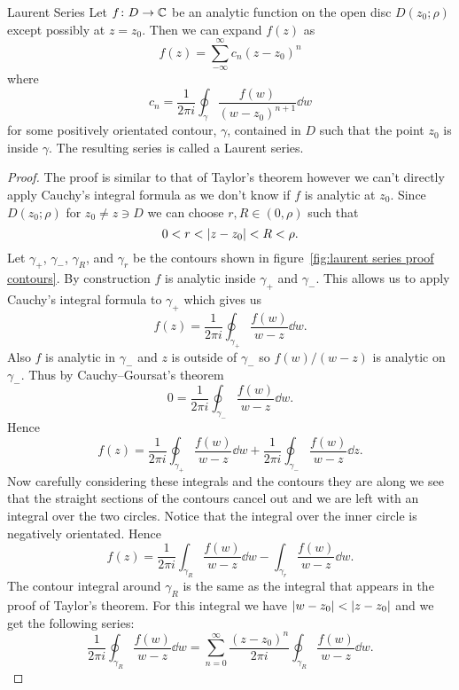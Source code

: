 \documentclass{article}
\newcommand{\discOpen}[2]{D\left({#1}; {#2}\right)}
\begin{document}
    \begin{theorem}{Laurent Series}{}
        Let \(f\colon D\to \mathbb{C}\) be an analytic function on the open disc \(\discOpen{z_0}{\rho}\) except possibly at \(z = z_0\).
        Then we can expand \(f(z)\) as
        \[f(z) = \sum_{-\infty}^{\infty} c_n(z - z_0)^n\]
        where
        \[c_n = \frac{1}{2\pi i}\oint_{\gamma} \frac{f(w)}{(w - z_0)^{n+1}}\dd{w}\]
        for some positively orientated contour, \(\gamma\), contained in \(D\) such that the point \(z_0\) is inside \(\gamma\).
        The resulting series is called a Laurent series.
    \end{theorem}
    \begin{proof}
        The proof is similar to that of Taylor's theorem however we can't directly apply Cauchy's integral formula as we don't know if \(f\) is analytic at \(z_0\).
        Since \(\discOpen{z_0}{\rho}\) for \(z_0\ne z \ni D\) we can choose \(r, R\in(0, \rho)\) such that
        \[0 < r < \abs{z - z_0} < R < \rho.\]
        Let \(\gamma_+\), \(\gamma_-\), \(\gamma_R\), and \(\gamma_r\) be the contours shown in figure~\ref{fig:laurent series proof contours}.
        By construction \(f\) is analytic inside \(\gamma_+\) and \(\gamma_-\).
        This allows us to apply Cauchy's integral formula to \(\gamma_+\) which gives us
        \[f(z) = \frac{1}{2\pi i}\oint_{\gamma_+} \frac{f(w)}{w - z}\dd{w}.\]
        Also \(f\) is analytic in \(\gamma_-\) and \(z\) is outside of \(\gamma_-\) so \(f(w)/(w - z)\) is analytic on \(\gamma_-\).
        Thus by Cauchy--Goursat's theorem
        \[0 = \frac{1}{2\pi i}\oint_{\gamma_-}\frac{f(w)}{w - z}\dd{w}.\]
        Hence
        \[f(z) = \frac{1}{2\pi i}\oint_{\gamma_+}\frac{f(w)}{w - z}\dd{w} + \frac{1}{2\pi i}\oint_{\gamma_-}\frac{f(w)}{w - z}\dd{z}.\]
        Now carefully considering these integrals and the contours they are along we see that the straight sections of the contours cancel out and we are left with an integral over the two circles.
        Notice that the integral over the inner circle is negatively orientated.
        Hence
        \[f(z) = \frac{1}{2\pi i} \int_{\gamma_R} \frac{f(w)}{w - z}\dd{w} - \int_{\gamma_r}\frac{f(w)}{w - z}\dd{w}.\]
        The contour integral around \(\gamma_R\) is the same as the integral that appears in the proof of Taylor's theorem.
        For this integral we have \(\abs{w - z_0} < \abs{z - z_0}\) and we get the following series:
        \[\frac{1}{2\pi i}\oint_{\gamma_R} \frac{f(w)}{w - z}\dd{w} = \sum_{n=0}^{\infty} \frac{(z - z_0)^n}{2\pi i} \oint_{\gamma_R}\frac{f(w)}{w - z}\dd{w}.\]

\end{proof}
\end{document}

